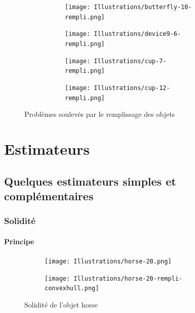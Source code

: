 \documentclass{article}
\begin{document}
      \begin{figure}[!h]
	\centering
	\begin{subfigure}{.47\textwidth}
	  \begin{subfigure}{.52\textwidth}
	    \centering
	    \texttt{[image: Illustrations/butterfly-10-rempli.png]}
	    \label{butterfly-rempli}
	  \end{subfigure}
	  \begin{subfigure}{.45\textwidth}
	    \centering
	    \texttt{[image: Illustrations/device9-6-rempli.png]}
	    \label{spirale-rempli}
	  \end{subfigure}
	\end{subfigure}
	\begin{subfigure}{.44\textwidth}
	  \begin{subfigure}{.46\textwidth}
	    \centering
	    \texttt{[image: Illustrations/cup-7-rempli.png]}
	  \label{1stcup-rempli}
	  \end{subfigure}
	  \begin{subfigure}{.46\textwidth}
	    \centering
	    \texttt{[image: Illustrations/cup-12-rempli.png]}
	  \label{2ndcup-rempli}
	  \end{subfigure}
	\end{subfigure}
	\caption{Problèmes soulevés par le remplissage des objets}
	\label{problèmes-remplissage}
      \end{figure}      
   
  \section{Estimateurs}
  
    \subsection{Quelques estimateurs simples et complémentaires}

      \subsubsection{Solidité}
      
	\paragraph{Principe}
	
	  \begin{figure}[!h]
	    \centering
	    \begin{subfigure}{.25\textwidth}
	      \centering
	      \texttt{[image: Illustrations/horse-20.png]}
	      \label{horse}
	    \end{subfigure}
	    \begin{subfigure}{.25\textwidth}
	      \centering
	      \texttt{[image: Illustrations/horse-20-rempli-convexhull.png]}
	    \label{horse-rempli-convexhull}
	    \end{subfigure}
	    \caption{Solidité de l'objet horse}
	    \label{solidité}
	  \end{figure}
	
\end{document}

